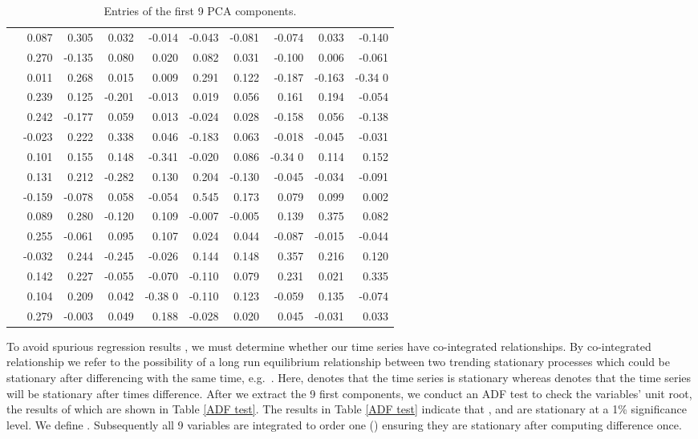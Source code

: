 \documentclass[10pt]{article}
\begin{document}
\begin{table}
\begin{center}
\begin{tabular}{crrrrrrrrr}
	 &	0.087	&	0.305	&	0.032	&	-0.014	&	-0.043	&	-0.081	&	-0.074	&	0.033	&	-0.140	\\
	  &	0.270       &	-0.135	&	0.080	&	0.020      &	0.082	&	0.031	&	-0.100     &	0.006	&	-0.061	\\		
	&	0.011	&	0.268	&	0.015	&	0.009	&	0.291	&	0.122	&	-0.187	&	-0.163	&	-0.34	0       \\
	&	0.239	&	0.125	&	-0.201	&	-0.013	&	0.019	&	0.056	&	0.161	&	0.194	&	-0.054	\\
	&	0.242	&	-0.177	&	0.059	&	0.013	&	-0.024	&	0.028	&	-0.158	&	0.056	&	-0.138	\\
	&	-0.023	&	0.222	&	0.338	&	0.046	&	-0.183	&	0.063	&	-0.018	&	-0.045	&	-0.031	\\
	&	0.101	&	0.155	&	0.148	&	-0.341	&	-0.020	&	0.086	&	-0.34	0      &	0.114	&	0.152	\\
	&	0.131	&	0.212	&	-0.282	&	0.130        &	0.204	&	-0.130	&	-0.045	&	-0.034	&	-0.091	\\	
	&	-0.159	&	-0.078	&	0.058	&	-0.054	&	0.545	&	0.173	&	0.079	&	0.099	&	0.002	\\
	&	0.089	&	0.280	&	-0.120	&	0.109	&	-0.007	&	-0.005	&	0.139	&	0.375	&	0.082	\\
	&	0.255	&	-0.061	&	0.095	&	0.107	&	0.024	&	0.044	&	-0.087	&	-0.015	&	-0.044	\\
	&	-0.032	&	0.244	&	-0.245	&	-0.026	&	0.144	&	0.148	&	0.357	&	0.216	&	0.120	\\
	&	0.142	&	0.227	&	-0.055	&	-0.070	&	-0.110	&	0.079	&	0.231	&	0.021	&	0.335	\\
	&	0.104	&	0.209	&	0.042	&	-0.38	0       &	-0.110	&	0.123	&	-0.059	&	0.135	&	-0.074	\\
	&	0.279	&	-0.003	&	0.049	&	0.188	&	-0.028	&	0.020        &	0.045	&	-0.031	&	0.033	\\	
\hline
\end{tabular}
\caption{Entries of the first 9 PCA components.}
\label{comp9coef}
\end{center}
\end{table}



To avoid spurious regression results \cite{Yule1926,Granger1974}, we must determine whether our time series have co-integrated relationships. By co-integrated relationship we refer to the possibility of a long run equilibrium relationship between two trending stationary processes which could be stationary after differencing with the same time, e.g.~.
Here,  denotes that the time series is stationary whereas  denotes that the time series will be stationary after  times difference.   
After we extract the 9 first components, we conduct an ADF test \cite{Dickey1979,Fuller1976} to check the variables' unit root, the results of which are shown in Table \ref{ADF test}. 
The results in Table \ref{ADF test} indicate that ,  and  are stationary at a 1\% significance level. We define .
Subsequently all 9 variables are integrated to order one () ensuring they are stationary after computing difference once. 
\end{document}
